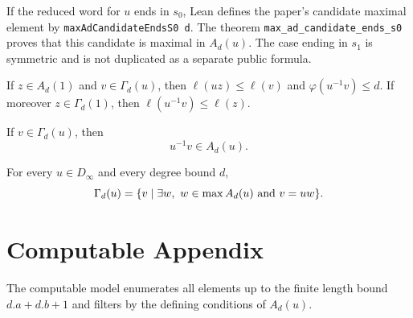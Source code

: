 \begin{theorem}\label{formula_4_ends_s0}
  \leanok
  If the reduced word for $u$ ends in $s_0$, Lean defines the paper's candidate
  maximal element by \texttt{maxAdCandidateEndsS0 d}.  The theorem
  \texttt{max\_ad\_candidate\_ends\_s0} proves that this candidate is maximal
  in $A_d(u)$.  The case ending in $s_1$ is symmetric and is not duplicated as a
  separate public formula.
\end{theorem}

\begin{lemma}\label{lemma_3_4}
  \leanok
  If $z\in A_d(1)$ and $v\in\Gamma_d(u)$, then $\ell(uz)\le\ell(v)$ and
  $\varphi(u^{-1}v)\le d$.  If moreover $z\in\Gamma_d(1)$, then
  $\ell(u^{-1}v)\le\ell(z)$.
\end{lemma}

\begin{lemma}\label{lemma_3_5}
  \leanok
  If $v\in\Gamma_d(u)$, then
  \[
    u^{-1}v\in A_d(u).
  \]
\end{lemma}

\begin{theorem}\label{curve_nbhd_eq_mul_max_ad}
  \leanok
  For every $u\in D_\infty$ and every degree bound $d$,
  \[
    \Gamma_d(u)=\{v\mid \exists w,\ w\in\max A_d(u)\ \hbox{and}\ v=u w\}.
  \]
\end{theorem}

\chapter{Computable Appendix}

\begin{definition}\label{enumerateD_def}
  \leanok
  The computable model enumerates all elements up to the finite length bound
  $d.a+d.b+1$ and filters by the defining conditions of $A_d(u)$.
\end{definition}

